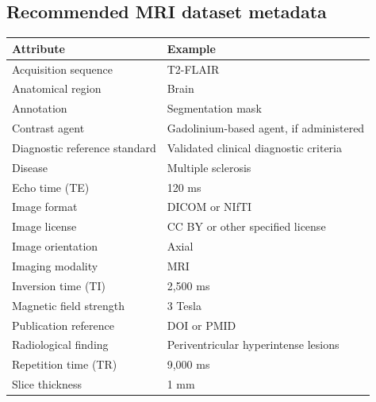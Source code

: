 \subsection{Recommended MRI dataset metadata}
\begin{longtable}{@{}p{}p{}@{}}
\toprule
\textbf{Attribute} & \textbf{Example} \\
\midrule
Acquisition sequence & T2-FLAIR \\
Anatomical region & Brain \\
Annotation & Segmentation mask \\
Contrast agent & Gadolinium-based agent, if administered \\
Diagnostic reference standard & Validated clinical diagnostic criteria \\
Disease & Multiple sclerosis \\
Echo time (TE) & 120 ms \\
Image format & DICOM or NIfTI \\
Image license & CC BY or other specified license \\
Image orientation & Axial \\
Imaging modality & MRI \\
Inversion time (TI) & 2,500 ms \\
Magnetic field strength & 3 Tesla \\
Publication reference & DOI or PMID \\
Radiological finding & Periventricular hyperintense lesions \\
Repetition time (TR) & 9,000 ms \\
Slice thickness & 1 mm \\
\bottomrule
\end{longtable}

